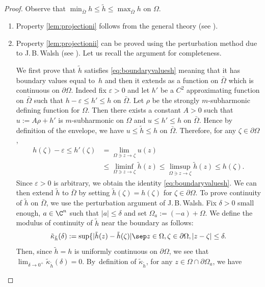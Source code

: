 \begin{proof}
Observe that $\min_{\bar \Omega} h \leq \tilde h \leq \max_{\bar \Omega} h$ on $\Omega$.
\begin{enumerate}
\item
Property \eqref{lem:projectioni} follows from the general theory (see \cite{Lu12}).

\item
Property \eqref{lem:projectionii} can be proved using the perturbation method due to J.\,B.\,Walsh (see \cite{Wal69}). Let us recall the argument for completeness.

We first prove that $\tilde h$ satisfies \eqref{eq:boundaryvaluesh} meaning that it has boundary values equal to~$h$ and then it extends as a function on $\bar \Omega$ which is continuous on $\partial \Omega$. Indeed fix $\varepsilon > 0$ and let $h'$ be a $C^2$ approximating function on $\bar \Omega$ such that $h - \varepsilon \leq h' \leq h $ on $\bar \Omega$. Let $\rho$ be the strongly $m$-subharmonic defining function for $\Omega$. Then there exists a constant $A > 0$ such that $u:= A \rho + h'$ is $m$-subharmonic on $\Omega$ and $u \leq h' \leq h$ on $\bar \Omega$. Hence by definition of the envelope, we have $u \leq \tilde h \leq h$ on $\bar \Omega$. Therefore, for any $\zeta \in \partial \Omega$,
\begin{align*}
h (\zeta) - \varepsilon \leq h' (\zeta) & = \lim_{\Omega \ni z \to \zeta } u (z) \\
& \leq \liminf_{\Omega \ni z \to \zeta } \tilde h (z) \leq \limsup_{\Omega \ni z \to \zeta } \tilde h (z) \leq h (\zeta).
\end{align*}
Since $\varepsilon > 0$ is arbitrary, we obtain the identity \eqref{eq:boundaryvaluesh}.
We can then extend $\tilde h$ to $\bar \Omega$ by setting $\tilde h (\zeta) = h (\zeta)$ for $\zeta \in \partial \Omega$. To prove continuity of $\tilde h$ on $\bar \Omega$, we use the perturbation argument of J.\,B.\,Walsh. Fix $\delta > 0$ small enough, $a \in \C^n$ such that $\vert a \vert \leq \delta$ and set $\Omega_a:= (- a) + \Omega$. We define the modulus of continuity of $\tilde{h}$ near the boundary as follows:
\[
\tilde{\kappa}_{\tilde h} (\delta):= \sup \{ \vert \tilde h(z) - \tilde{h} (\zeta)\vert \sep z \in \Omega, \zeta \in \partial \Omega, \vert z - \zeta\vert \leq \delta.
\]
Then, since $\tilde h = h$ is uniformly continuous on $\partial \Omega$, we see that $\lim_{\delta \to 0^+} \tilde{\kappa}_{\tilde h} (\delta) = 0$. By~definition of $\tilde{\kappa}_{\tilde h}$, for any $z \in \Omega \cap \partial \Omega_a$, we have

\end{enumerate}
\end{proof}
